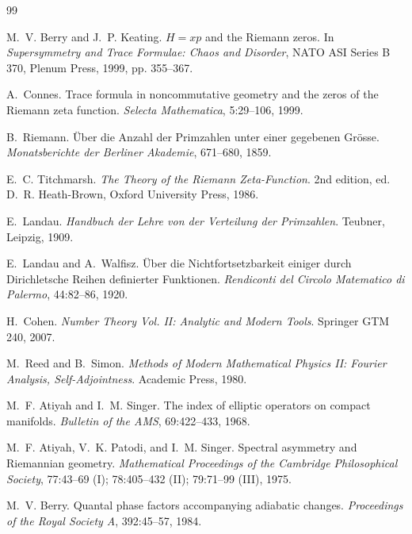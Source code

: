 \documentclass[11pt, a4paper]{article}
\numberwithin{equation}{section}
\begin{document}

\begin{thebibliography}{99}

M.~V. Berry and J.~P. Keating.
\newblock $H = xp$ and the Riemann zeros.
\newblock In \emph{Supersymmetry and Trace Formulae: Chaos and Disorder},
NATO ASI Series B 370, Plenum Press, 1999, pp. 355--367.

A.~Connes.
\newblock Trace formula in noncommutative geometry and the zeros of the
Riemann zeta function.
\newblock \emph{Selecta Mathematica}, 5:29--106, 1999.

B.~Riemann.
\newblock Über die Anzahl der Primzahlen unter einer gegebenen Grösse.
\newblock \emph{Monatsberichte der Berliner Akademie}, 671--680, 1859.

E.~C. Titchmarsh.
\newblock \emph{The Theory of the Riemann Zeta-Function}.
\newblock 2nd edition, ed. D.~R. Heath-Brown, Oxford University Press, 1986.

E.~Landau.
\newblock \emph{Handbuch der Lehre von der Verteilung der Primzahlen}.
\newblock Teubner, Leipzig, 1909.

E.~Landau and A.~Walfisz.
\newblock Über die Nichtfortsetzbarkeit einiger durch Dirichletsche Reihen
definierter Funktionen.
\newblock \emph{Rendiconti del Circolo Matematico di Palermo}, 44:82--86, 1920.

H.~Cohen.
\newblock \emph{Number Theory Vol. II: Analytic and Modern Tools}.
\newblock Springer GTM 240, 2007.

M.~Reed and B.~Simon.
\newblock \emph{Methods of Modern Mathematical Physics II: Fourier Analysis,
Self-Adjointness}.
\newblock Academic Press, 1980.

M.~F. Atiyah and I.~M. Singer.
\newblock The index of elliptic operators on compact manifolds.
\newblock \emph{Bulletin of the AMS}, 69:422--433, 1968.

M.~F. Atiyah, V.~K. Patodi, and I.~M. Singer.
\newblock Spectral asymmetry and Riemannian geometry.
\newblock \emph{Mathematical Proceedings of the Cambridge Philosophical Society},
77:43--69 (I); 78:405--432 (II); 79:71--99 (III), 1975.

M.~V. Berry.
\newblock Quantal phase factors accompanying adiabatic changes.
\newblock \emph{Proceedings of the Royal Society A}, 392:45--57, 1984.


\end{thebibliography}
\end{document}
